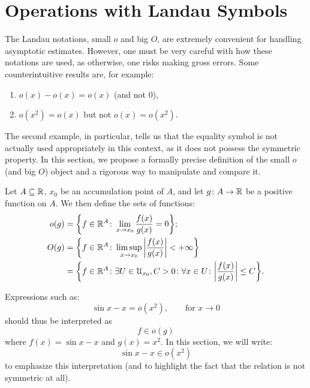 \section{Operations with Landau Symbols}
\label{sec:landau}

The
%
%
%
%
%
%
Landau notations, small $o$ and big $O$, are extremely convenient for handling
asymptotic estimates. However, one must be very careful with how these notations
are used, as otherwise, one risks making gross errors. Some counterintuitive
results are, for example:
\begin{enumerate}
\item $o(x) - o(x) = o(x)$ (and not $0$),
\item $o(x^2) = o(x)$ but not $o(x) = o(x^2)$.
\end{enumerate}

The second example, in particular, tells us that the equality symbol is not
actually used appropriately in this context, as it does not possess the
symmetric property. In this section, we propose a formally precise definition of
the small $o$ (and big $O$) object and a rigorous way to manipulate and compare
it.

\begin{definition}
Let $A\subseteq {\mathbb R}$, $x_0$ be an accumulation point of $A$, and let $g\colon A
\to {\mathbb R}$ be a positive function on $A$. We then define the sets of
functions:
\begin{align*}
  o(g) &= {\left\{ f\in {\mathbb R}^A \colon \lim_{x\to x_0}\frac{f(x)}{g(x)} = 0 \right\}};\\
    O(g) &= {\left\{ f\in {\mathbb R}^A \colon \limsup_{x\to x_0}{\left|\frac{f(x)}{g(x)}\right|}
  < + \infty \right\}}\\
              &= {\left\{ f\in {\mathbb R}^A \colon \exists U\in \mathcal U_{x_0}, C>0 \colon
       \forall x \in U\colon {\left|\frac{f(x)}{g(x)}\right|}\le C \right\}}.
\end{align*}
\end{definition}

Expressions such as:
\[
  \sin x - x = o(x^2), \qquad \text{for $x\to 0$}
\]
should thus be interpreted as
\[
  f \in o(g)
\]
where $f(x) = \sin x -x $ and $g(x) = x^2$.
In this section, we will write:
\begin{equation}\label{eq:39523}
  \sin x - x \in o(x^2)
\end{equation}
to emphasize this interpretation (and to highlight the fact that the relation is
not symmetric at all).


